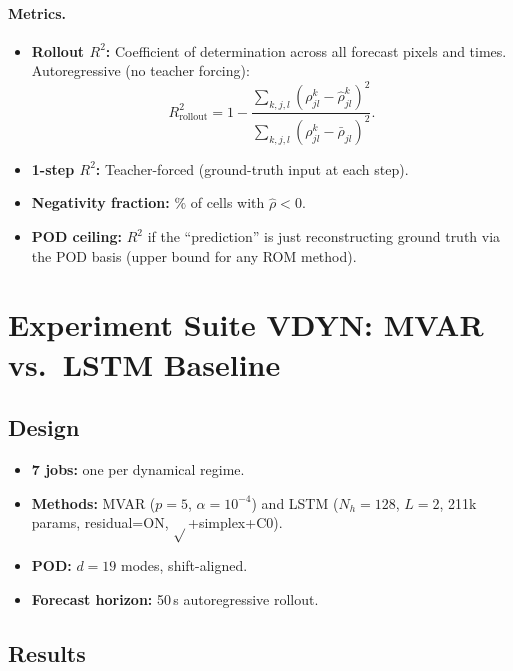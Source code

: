 \documentclass[11pt]{article}
\newcommand{\Rtwo}{R^2}
\begin{document}
\paragraph{Metrics.}
\begin{itemize}[nosep]
  \item \textbf{Rollout $\Rtwo$:} Coefficient of determination across all forecast
    pixels and times.  Autoregressive (no teacher forcing):
    \begin{equation}
      \Rtwo_{\text{rollout}} = 1 - \frac{\sum_{k,j,l}(\rho^k_{jl} - \hat\rho^k_{jl})^2}
      {\sum_{k,j,l}(\rho^k_{jl} - \bar\rho_{jl})^2}.
    \end{equation}
  \item \textbf{1-step $\Rtwo$:} Teacher-forced (ground-truth input at each step).
  \item \textbf{Negativity fraction:} $\%$ of cells with $\hat\rho < 0$.
  \item \textbf{POD ceiling:} $\Rtwo$ if the ``prediction'' is just reconstructing
    ground truth via the POD basis (upper bound for any ROM method).
\end{itemize}


\section{Experiment Suite VDYN: MVAR vs.\ LSTM Baseline}
\label{sec:vdyn}

\subsection{Design}
\begin{itemize}[nosep]
  \item \textbf{7 jobs:} one per dynamical regime.
  \item \textbf{Methods:} MVAR ($p=5$, $\alpha=10^{-4}$) and LSTM ($N_h=128$, $L=2$,
    211k params, residual=ON, $\sqrt{}$+simplex+C0).
  \item \textbf{POD:} $d=19$ modes, shift-aligned.
  \item \textbf{Forecast horizon:} 50\,s autoregressive rollout.
\end{itemize}

\subsection{Results}
\end{document}
